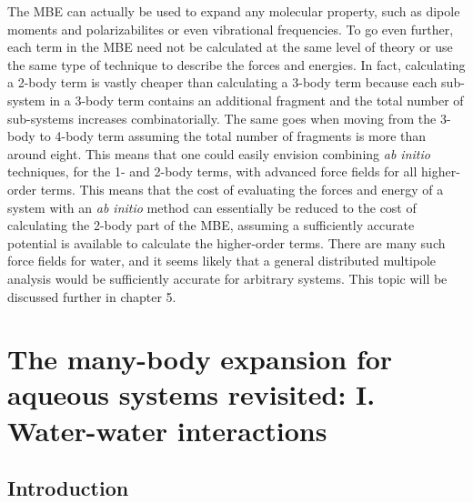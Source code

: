 \documentclass[11pt, proquest]{uwthesis}[2020/02/24]
\begin{document}
\par The MBE can actually be used to expand any molecular property, such as dipole moments and polarizabilites\autocite{medders_many-body_2013} or even vibrational frequencies\autocite{howard_n-body_2013,heindel_origin_2018}. To go even further, each term in the MBE need not be calculated at the same level of theory or use the same type of technique to describe the forces and energies. In fact, calculating a 2-body term is vastly cheaper than calculating a 3-body term because each sub-system in a 3-body term contains an additional fragment and the total number of sub-systems increases combinatorially. The same goes when moving from the 3-body to 4-body term assuming the total number of fragments is more than around eight. This means that one could easily envision combining \textit{ab initio} techniques, for the 1- and 2-body terms, with advanced force fields for all higher-order terms. This means that the cost of evaluating the forces and energy of a system with an \textit{ab initio} method can essentially be reduced to the cost of calculating the 2-body part of the MBE, assuming a sufficiently accurate potential is available to calculate the higher-order terms. There are many such force fields for water, and it seems likely that a general distributed multipole analysis would be sufficiently accurate for arbitrary systems. This topic will be discussed further in chapter 5.

\chapter{The many-body expansion for aqueous systems revisited: I. Water-water interactions}

\section{Introduction}
\end{document}
